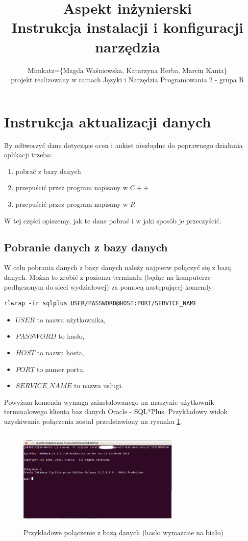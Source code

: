 \documentclass[]{article}
\title{Aspekt inżynierski \\ Instrukcja instalacji i konfiguracji narzędzia}
\author{Mimkatz=\{Magda Waśniowska, Katarzyna Herba, Marcin Kania\}\\projekt realizowany w ramach Języki i Narzędzia Programowania 2 - grupa R}
\begin{document}
\maketitle

\section{Instrukcja aktualizacji danych}

By odtworzyć dane dotyczące ocen i ankiet niezbędne do poprawnego działania aplikacji trzeba:
\begin{enumerate}
	\item pobrać z bazy danych
	\item przepuścić przez program napisany w $C++$
	\item przepuścić przez program napisany w $R$
\end{enumerate}
W tej części opiszemy, jak te dane pobrać i w jaki sposób je przeczyścić.

\subsection*{Pobranie danych z bazy danych}
W celu pobrania danych z bazy danych należy najpierw połączyć się z bazą danych. Można to zrobić z poziomu terminalu (będąc na komputerze podłączonym do sieci wydziałowej) za pomocą następującej komendy:
\begin{verbatim}
rlwrap -ir sqlplus USER/PASSWORD@HOST:PORT/SERVICE_NAME
\end{verbatim}
\begin{itemize}
	\item $USER$ to nazwa użytkownika,
	\item $PASSWORD$ to hasło,
	\item $HOST$ to nazwa hosta,
	\item $PORT$ to numer portu,
	\item $SERVICE\_NAME$ to nazwa usługi.
\end{itemize}
Powyższa komenda wymaga zainstalowanego na maszynie użytkownik terminalowego klienta baz danych Oracle - SQL*Plus. Przykładowy widok uzyskiwania połączenia został przedstawiony na rysunku \ref{polaczenie_z_baza}.

\begin{figure}
	\centering
	\includegraphics[width=80mm, height=50mm]{obrazki/logowanie-sql.png}
	\caption{Przykładowe połączenie z bazą danych (hasło wymazane na biało)}
	\label{polaczenie_z_baza}
\end{figure}
\end{document}
